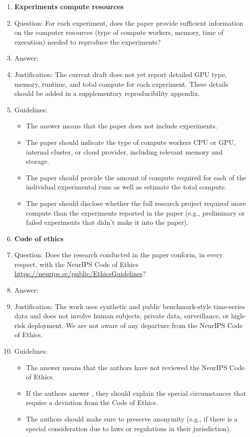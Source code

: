 \begin{enumerate}
\item {\bf Experiments compute resources}
    \item[] Question: For each experiment, does the paper provide sufficient information on the computer resources (type of compute workers, memory, time of execution) needed to reproduce the experiments?
    \item[] Answer: \answerNo{}
    \item[] Justification: The current draft does not yet report detailed GPU type, memory, runtime, and total compute for each experiment. These details should be added in a supplementary reproducibility appendix.
    \item[] Guidelines:
    \begin{itemize}
        \item The answer \answerNA{} means that the paper does not include experiments.
        \item The paper should indicate the type of compute workers CPU or GPU, internal cluster, or cloud provider, including relevant memory and storage.
        \item The paper should provide the amount of compute required for each of the individual experimental runs as well as estimate the total compute. 
        \item The paper should disclose whether the full research project required more compute than the experiments reported in the paper (e.g., preliminary or failed experiments that didn't make it into the paper). 
    \end{itemize}
    
\item {\bf Code of ethics}
    \item[] Question: Does the research conducted in the paper conform, in every respect, with the NeurIPS Code of Ethics \url{https://neurips.cc/public/EthicsGuidelines}?
    \item[] Answer: \answerYes{}
    \item[] Justification: The work uses synthetic and public benchmark-style time-series data and does not involve human subjects, private data, surveillance, or high-risk deployment. We are not aware of any departure from the NeurIPS Code of Ethics.
    \item[] Guidelines:
    \begin{itemize}
        \item The answer \answerNA{} means that the authors have not reviewed the NeurIPS Code of Ethics.
        \item If the authors answer \answerNo, they should explain the special circumstances that require a deviation from the Code of Ethics.
        \item The authors should make sure to preserve anonymity (e.g., if there is a special consideration due to laws or regulations in their jurisdiction).
    \end{itemize}



\end{enumerate}
